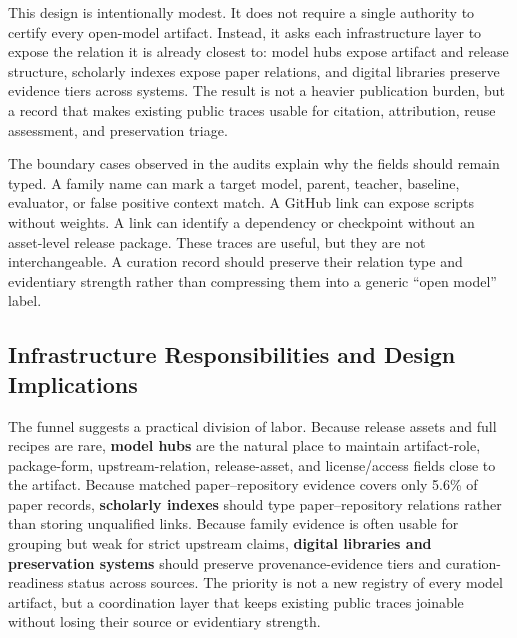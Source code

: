 This design is intentionally modest. It does not require a single authority to certify every open-model artifact. Instead, it asks each infrastructure layer to expose the relation it is already closest to: model hubs expose artifact and release structure, scholarly indexes expose paper relations, and digital libraries preserve evidence tiers across systems. The result is not a heavier publication burden, but a record that makes existing public traces usable for citation, attribution, reuse assessment, and preservation triage.

The boundary cases observed in the audits explain why the fields should remain typed. A family name can mark a target model, parent, teacher, baseline, evaluator, or false positive context match. A GitHub link can expose scripts without weights. A \hf link can identify a dependency or checkpoint without an asset-level release package. These traces are useful, but they are not interchangeable. A curation record should preserve their relation type and evidentiary strength rather than compressing them into a generic ``open model'' label.

\subsection{Infrastructure Responsibilities and Design Implications}

The funnel suggests a practical division of labor. Because release assets and full recipes are rare, \textbf{model hubs} are the natural place to maintain artifact-role, package-form, upstream-relation, release-asset, and license/access fields close to the artifact. Because matched paper--\hf repository evidence covers only 5.6\% of paper records, \textbf{scholarly indexes} should type paper--repository relations rather than storing unqualified links. Because family evidence is often usable for grouping but weak for strict upstream claims, \textbf{digital libraries and preservation systems} should preserve provenance-evidence tiers and curation-readiness status across sources. The priority is not a new registry of every model artifact, but a coordination layer that keeps existing public traces joinable without losing their source or evidentiary strength.

